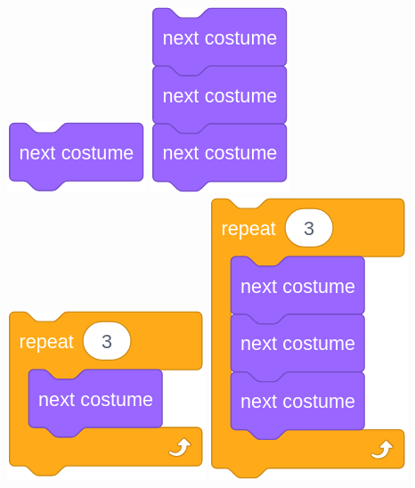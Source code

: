 \documentclass[letterpaper,12pt]{article}
\begin{document}
\includegraphics[scale=.3,valign=t]{q3_script0.png} \hspace{1.5cm}
\includegraphics[scale=.3,valign=t]{q3_script1.png} \hspace{1.5cm}
\includegraphics[scale=.3,valign=t]{q3_script2.png} \hspace{1.5cm}
\includegraphics[scale=.3,valign=t]{q3_script3.png} \hspace{1.5cm} \\
\end{document}
